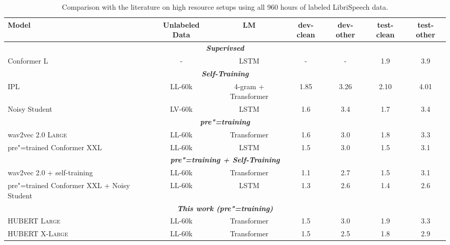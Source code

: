 
\begin{table*}[t]
    \caption{Comparison with the literature on high resource setups using all 960 hours of labeled LibriSpeech data.}
    \centering
    \begin{tabular}{lcccccc}
        \toprule
        Model & Unlabeled Data & LM & dev-clean & dev-other & test-clean & test-other \\
        \midrule\midrule
        \multicolumn{7}{c}{\textit{\textbf{Superivsed}}} \\
        Conformer L~\parencite{gulati_conformer_2020} & - & LSTM & - & - & 1.9 & 3.9 \\
        
        \midrule\midrule
        \multicolumn{7}{c}{\textit{\textbf{Self-Training}}} \\
        IPL~\parencite{xu_iterative_2020} & LL-60k & 4-gram + Transformer & 1.85 & 3.26 & 2.10 & 4.01 \\
        Noisy Student~\parencite{park_improved_2020} & LV-60k & LSTM & 1.6 & 3.4 & 1.7 & 3.4 \\
        
        \midrule\midrule
        \multicolumn{7}{c}{\textit{\textbf{pre"=training}}} \\
        wav2vec 2.0 \textsc{Large}~\parencite{baevski_wav2vec_2020} & LL-60k & Transformer & 1.6 & 3.0 & 1.8 & 3.3 \\
        pre"=trained Conformer XXL~\parencite{zhang_pushing_2020} & LL-60k & LSTM & 1.5 & 3.0 & 1.5 & 3.1 \\
        
        \midrule\midrule
        \multicolumn{7}{c}{\textit{\textbf{pre"=training + Self-Training}}} \\
        wav2vec 2.0 + self-training~\parencite{xu2020self} & LL-60k & Transformer & 1.1 & 2.7 & 1.5 & 3.1\\
        pre"=trained Conformer XXL + Noisy Student~\parencite{zhang_pushing_2020} & LL-60k & LSTM & 1.3 & 2.6 & 1.4 & 2.6 \\
        
        \midrule\midrule
        \multicolumn{7}{c}{\textit{\textbf{This work (pre"=training)}}} \\
        HUBERT \textsc{Large}   & LL-60k & Transformer & 1.5 & 3.0 & 1.9 & 3.3 \\
        HUBERT \textsc{X-Large} & LL-60k & Transformer & 1.5 & 2.5 & 1.8 & 2.9 \\
        
        \bottomrule
    \end{tabular}
    \label{tab:main_hi}
\end{table*}
